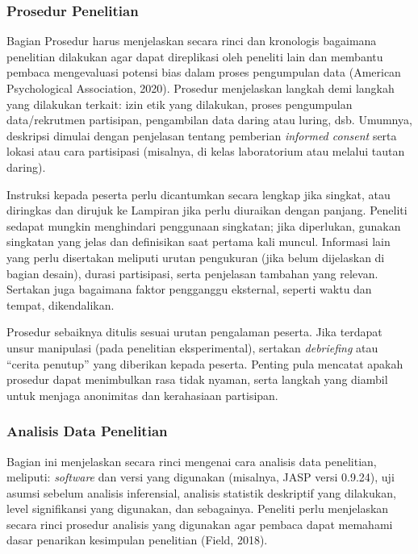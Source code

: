 \documentclass[
  indonesian,
  letterpaper,
  DIV=11,
  numbers=noendperiod]{scrreprt}
\begin{document}
\subsubsection{Prosedur Penelitian}\label{prosedur-penelitian}

Bagian Prosedur harus menjelaskan secara rinci dan kronologis bagaimana
penelitian dilakukan agar dapat direplikasi oleh peneliti lain dan
membantu pembaca mengevaluasi potensi bias dalam proses pengumpulan data
(American Psychological Association, 2020). Prosedur menjelaskan langkah
demi langkah yang dilakukan terkait: izin etik yang dilakukan, proses
pengumpulan data/rekrutmen partisipan, pengambilan data daring atau
luring, dsb. Umumnya, deskripsi dimulai dengan penjelasan tentang
pemberian \emph{informed consent} serta lokasi atau cara partisipasi
(misalnya, di kelas laboratorium atau melalui tautan daring).

Instruksi kepada peserta perlu dicantumkan secara lengkap jika singkat,
atau diringkas dan dirujuk ke Lampiran jika perlu diuraikan dengan
panjang. Peneliti sedapat mungkin menghindari penggunaan singkatan; jika
diperlukan, gunakan singkatan yang jelas dan definisikan saat pertama
kali muncul. Informasi lain yang perlu disertakan meliputi urutan
pengukuran (jika belum dijelaskan di bagian desain), durasi partisipasi,
serta penjelasan tambahan yang relevan. Sertakan juga bagaimana faktor
pengganggu eksternal, seperti waktu dan tempat, dikendalikan.

Prosedur sebaiknya ditulis sesuai urutan pengalaman peserta. Jika
terdapat unsur manipulasi (pada penelitian eksperimental), sertakan
\emph{debriefing} atau ``cerita penutup'' yang diberikan kepada peserta.
Penting pula mencatat apakah prosedur dapat menimbulkan rasa tidak
nyaman, serta langkah yang diambil untuk menjaga anonimitas dan
kerahasiaan partisipan.

\subsubsection{Analisis Data Penelitian}\label{analisis-data-penelitian}

Bagian ini menjelaskan secara rinci mengenai cara analisis data
penelitian, meliputi: \emph{software} dan versi yang digunakan
(misalnya, JASP versi 0.9.24), uji asumsi sebelum analisis inferensial,
analisis statistik deskriptif yang dilakukan, level signifikansi yang
digunakan, dan sebagainya. Peneliti perlu menjelaskan secara rinci
prosedur analisis yang digunakan agar pembaca dapat memahami dasar
penarikan kesimpulan penelitian (Field, 2018).
\end{document}
